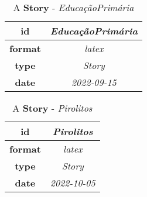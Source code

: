 \documentclass{article}
\begin{document}
    \begin{table}[ht!]
        \centering
        \begin{tabular}{|c|c|}
            \hline
            
                \textbf{ id } & \textit{ EducaçãoPrimária } \\
                \hline
            
                \textbf{ format } & \textit{ latex } \\
                \hline
            
                \textbf{ type } & \textit{ Story } \\
                \hline
            
                \textbf{ date } & \textit{ 2022-09-15 } \\
                \hline
            
        \end{tabular}
        \caption{A \textbf{ Story }-\textit{ EducaçãoPrimária }} %
        \label{table:\arabic{tablecounter2}} %
    \end{table}

    \begin{table}[ht!]
        \centering
        \begin{tabular}{|c|c|}
            \hline
            
                \textbf{ id } & \textit{ Pirolitos } \\
                \hline
            
                \textbf{ format } & \textit{ latex } \\
                \hline
            
                \textbf{ type } & \textit{ Story } \\
                \hline
            
                \textbf{ date } & \textit{ 2022-10-05 } \\
                \hline
            
        \end{tabular}
        \caption{A \textbf{ Story }-\textit{ Pirolitos }} %
        \label{table:\arabic{tablecounter2}} %
    \end{table}
\end{document}
